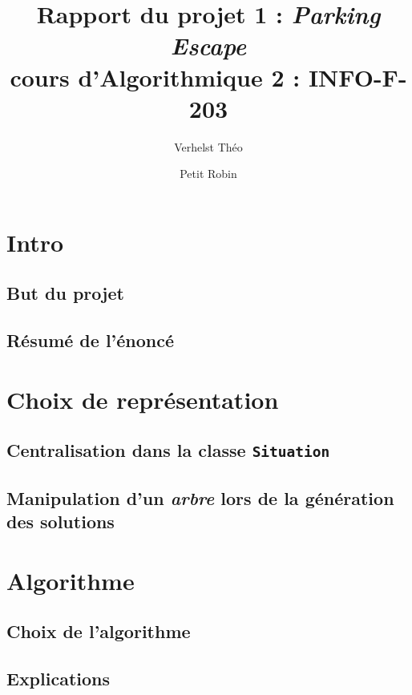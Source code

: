 \documentclass{article}
\title{Rapport du projet 1 : \textit{Parking Escape}\\cours d'Algorithmique 2 : INFO-F-203}
\author{Verhelst Théo \and Petit Robin}
\begin{document}
\maketitle
\tableofcontents
\newpage
{}

\section{Intro}
    \subsection{But du projet}
    \subsection{Résumé de l'énoncé}

\section{Choix de représentation}
    \subsection{Centralisation dans la classe \texttt{Situation}}
    \subsection{Manipulation d'un \textit{arbre} lors de la génération des solutions}

\section{Algorithme}
    \subsection{Choix de l'algorithme}
    \subsection{Explications}
\end{document}
